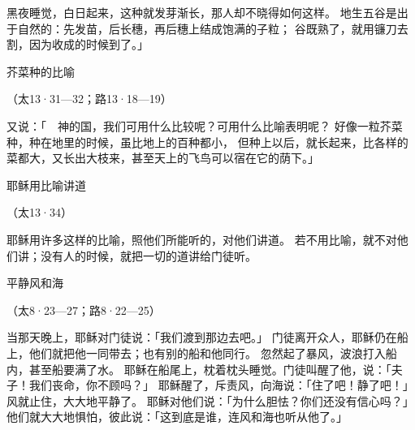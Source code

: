 {黑夜睡觉，白日起来，这种就发芽渐长，那人却不晓得如何这样。
地生五谷是出于自然的：先发苗，后长穗，再后穗上结成饱满的子粒；
谷既熟了，就用镰刀去割，因为收成的时候到了。」
\par }{\SH 芥菜种的比喻
\par }{\R （太13·31—32；路13·18—19）
\par }{\PP {}又说：「　神的国，我们可用什么比较呢？可用什么比喻表明呢？
好像一粒芥菜种，种在地里的时候，虽比地上的百种都小，
但种上以后，就长起来，比各样的菜都大，又长出大枝来，甚至天上的飞鸟可以宿在它的荫下。」
\par }{\SH 耶稣用比喻讲道
\par }{\R （太13·34）
\par }{\PP {}耶稣用许多这样的比喻，照他们所能听的，对他们讲道。
若不用比喻，就不对他们讲；没有人的时候，就把一切的道讲给门徒听。
\par }{\SH 平静风和海
\par }{\R （太8·23—27；路8·22—25）
\par }{\PP {}当那天晚上，耶稣对门徒说：「我们渡到那边去吧。」
门徒离开众人，耶稣仍在船上，他们就把他一同带去；也有别的船和他同行。
忽然起了暴风，波浪打入船内，甚至船要满了水。
耶稣在船尾上，枕着枕头睡觉。门徒叫醒了他，说：「夫子！我们丧命，你不顾吗？」
耶稣醒了，斥责风，向海说：「住了吧！静了吧！」风就止住，大大地平静了。
耶稣对他们说：「为什么胆怯？你们还没有信心吗？」
他们就大大地惧怕，彼此说：「这到底是谁，连风和海也听从他了。」

}
